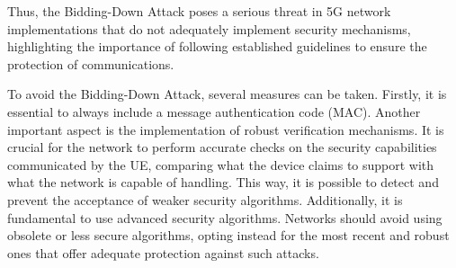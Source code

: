 \documentclass[english]{article}
\begin{document}
Thus, the Bidding-Down Attack poses a serious threat in 5G network
implementations that do not adequately implement security mechanisms,
highlighting the importance of following established guidelines to ensure the
protection of communications.

To avoid the Bidding-Down Attack, several measures can be taken. Firstly, it is
essential to always include a message authentication code (MAC). Another
important aspect is the implementation of robust verification mechanisms. It is
crucial for the network to perform accurate checks on the security capabilities
communicated by the UE, comparing what the device claims to support with what
the network is capable of handling. This way, it is possible to detect and
prevent the acceptance of weaker security algorithms. Additionally, it is
fundamental to use advanced security algorithms. Networks should avoid using
obsolete or less secure algorithms, opting instead for the most recent and
robust ones that offer adequate protection against such attacks.



\end{document}

